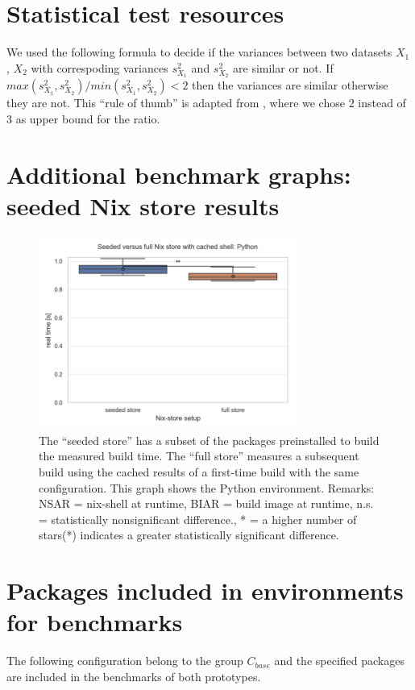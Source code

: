 \section{Statistical test resources}\label{appendix:statistical-test}
We used the following formula to decide if the variances between two datasets $X_1$, $X_2$ with correspoding variances ${s^2_{X_1}}$ and ${s^2_{X_2}}$ are similar or not. If $max({s^2_{X_1}}, {s^2_{X_2}})/min({s^2_{X_1}},{s^2_{X_2}}) < 2$ then the variances are similar otherwise they are not. This ``rule of thumb'' is adapted from \cite{unequealVariances}, where we chose $2$ instead of $3$ as upper bound for the ratio.

\section{Additional benchmark graphs: seeded Nix store results}
\begin{figure}[h!]
  \centering
  \includegraphics[width=0.75\textwidth]{thesis/graphics/nsar-plots/seeded_versus_full_nix_store_with_cached_shell:_python.png}
  \caption{The “seeded store” has a subset of the packages preinstalled to build the measured build time. The “full store” measures a subsequent build using the cached results of a first-time build with the same configuration. This graph shows the Python environment. Remarks: NSAR = nix-shell at runtime, BIAR = build image at runtime, n.s. = statistically nonsignificant difference., * = a higher number of stars(*) indicates a greater statistically significant difference.}
  \label{appendix:seeded-nix-store-python}
\end{figure}

\section{Packages included in environments for benchmarks}\label{appendix:bench-envs-packages}
The following configuration belong to the group $C_{base}$ and the specified packages are included in the benchmarks of both prototypes.
